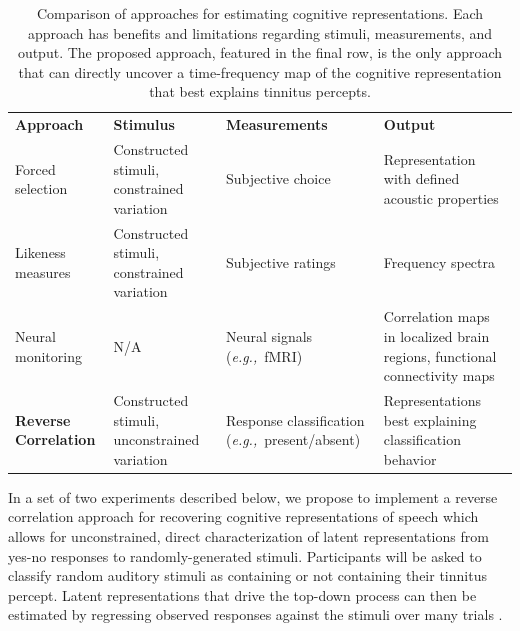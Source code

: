 \documentclass[11pt, notitlepage]{article} %
\newcommand{\myfloatalign}{\centering} %
\def\eg{{\emph{e.g.,}}~}
\begin{document}
\begin{table}[h]
	\myfloatalign
	\begin{tabularx}{\textwidth}{>{\raggedright}p{35mm} >{\raggedright\arraybackslash}p{40mm} >{\raggedright\arraybackslash}p{45mm} >{\raggedright\arraybackslash}p{50mm}}
		\toprule
		\textbf{Approach} & \textbf{Stimulus} & \textbf{Measurements} & \textbf{Output} \\ [0.5ex] 
		\rowcolor{Gray} Forced selection & Constructed stimuli, constrained variation & Subjective choice & Representation with \newline defined acoustic properties \\
		Likeness measures & Constructed stimuli, constrained variation & Subjective ratings & Frequency spectra \\
		\rowcolor{Gray} Neural monitoring & N/A & Neural signals (\eg fMRI) & Correlation maps in localized brain regions, functional connectivity maps \\
		\textbf{Reverse Correlation} & Constructed stimuli, unconstrained variation & Response classification (\eg present/absent) & Representations best explaining classification behavior \\
		\bottomrule
	\end{tabularx}
	\caption[Approaches]{Comparison of approaches for estimating cognitive representations.
	Each approach has benefits and limitations regarding stimuli, measurements, and output.
	The proposed approach, featured in the final row, is the only approach that can directly
	uncover a time-frequency map of the cognitive representation that best explains tinnitus percepts.}
	\label{tab:approaches}
\end{table}

In a set of two experiments described below, we propose to implement a reverse correlation
approach for recovering cognitive representations of speech which allows for unconstrained, direct
characterization of latent representations from yes-no responses to randomly-generated stimuli.
Participants will be asked to classify random auditory stimuli as containing or not containing their tinnitus percept.
Latent representations that drive the top-down process
can then be estimated by regressing observed responses against the stimuli over many trials \cite{mineaultImprovedClassificationImages2009}.
\end{document}

